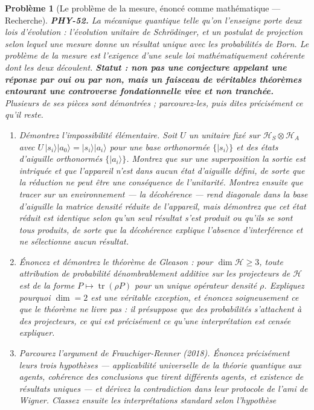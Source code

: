 \documentclass[11pt]{article}
\newtheorem{problem}{Problème}
\begin{document}
\begin{problem}[{Le problème de la mesure, énoncé comme mathématique --- Recherche}]
\textbf{PHY-52.} La mécanique quantique telle qu'on l'enseigne porte deux lois d'évolution :
l'évolution unitaire de Schrödinger, et un postulat de projection selon lequel une mesure donne un
résultat unique avec les probabilités de Born. Le problème de la mesure est l'exigence d'une seule
loi mathématiquement cohérente dont les deux découlent. \textbf{Statut : non pas une conjecture
appelant une réponse par oui ou par non, mais un faisceau de véritables théorèmes entourant une
controverse fondationnelle vive et non tranchée.} Plusieurs de ses pièces sont démontrées ;
parcourez-les, puis dites précisément ce qu'il reste.
\begin{enumerate}
\item[(a)] Démontrez l'impossibilité élémentaire. Soit $U$ un unitaire fixé sur
$\mathcal{H}_S \otimes \mathcal{H}_A$ avec $U\,|s_i\rangle|a_0\rangle = |s_i\rangle|a_i\rangle$
pour une base orthonormée $\{|s_i\rangle\}$ et des états d'aiguille orthonormés
$\{|a_i\rangle\}$. Montrez que sur une superposition la sortie est intriquée et que l'appareil
n'est dans aucun état d'aiguille défini, de sorte que la réduction ne peut être une conséquence de
l'unitarité. Montrez ensuite que tracer sur un environnement --- la décohérence --- rend diagonale
dans la base d'aiguille la matrice densité réduite de l'appareil, mais démontrez que cet état
réduit est identique selon qu'un seul résultat s'est produit ou qu'ils se sont tous produits, de
sorte que la décohérence explique l'absence d'interférence et ne sélectionne aucun résultat.
\item[(b)] Énoncez et démontrez le théorème de Gleason : pour $\dim\mathcal{H}\ge 3$, toute attribution
de probabilité dénombrablement additive sur les projecteurs de $\mathcal{H}$ est de la forme
$P \mapsto \operatorname{tr}(\rho P)$ pour un unique opérateur densité $\rho$. Expliquez
pourquoi $\dim = 2$ est une véritable exception, et énoncez soigneusement ce que le théorème ne
livre pas : il présuppose que des probabilités s'attachent à des projecteurs, ce qui est
précisément ce qu'une interprétation est censée expliquer.
\item[(c)] Parcourez l'argument de Frauchiger-Renner (2018). Énoncez précisément leurs trois hypothèses ---
applicabilité universelle de la théorie quantique aux agents, cohérence des conclusions que
tirent différents agents, et existence de résultats uniques --- et dérivez la contradiction dans
leur protocole de l'ami de Wigner. Classez ensuite les interprétations standard selon l'hypothèse

\end{enumerate}
\end{problem}
\end{document}
